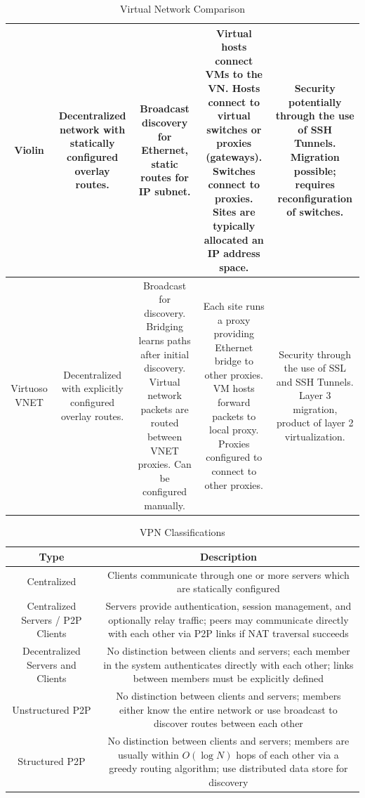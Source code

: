 \begin{table}[ht]
\begin{tabular*}{0.75\textwidth}{|c||c|c|c|c|}
\\ \hline
Violin
&
Decentralized network with statically configured overlay routes.
&
Broadcast discovery for Ethernet, static routes for IP subnet.
&
Virtual hosts connect VMs to the VN.  Hosts connect to virtual switches or
proxies (gateways).  Switches connect to proxies.  Sites are typically
allocated an IP address space.
&
Security potentially through the use of SSH Tunnels.  Migration possible;
requires reconfiguration of switches. 
\\ \hline
Virtuoso VNET
&
Decentralized with explicitly configured overlay routes.
&
Broadcast for discovery.  Bridging learns paths after initial discovery.  Virtual
network packets are routed between VNET proxies.  Can be configured manually.
&
Each site runs a proxy providing Ethernet bridge to other proxies.  VM hosts
forward packets to local proxy.  Proxies configured to connect to other proxies.
&
Security through the use of SSL and SSH Tunnels.  Layer 3 migration, product of
layer 2 virtualization.
\\ \hline
\end{tabular*}
\caption{Virtual Network Comparison}
\label{tab:virtual_networks}
\end{table}

\begin{table}[ht]
\caption{VPN Classifications}
\label{tab:vpn_types}
\begin{center}
\begin{tabular*}{0.75\textwidth}{|c|c|} \hline
Type & Description \\ \hline
Centralized & Clients communicate through one or more servers which are statically
configured \\ \hline
Centralized Servers / P2P Clients & Servers provide authentication, session management, and
optionally relay traffic; peers may communicate directly with each
other via P2P links if NAT traversal succeeds\\ \hline
Decentralized Servers and Clients & No distinction between clients and servers;
each member in the system authenticates directly with each other; links between
members must be explicitly defined \\ \hline
Unstructured P2P & No distinction between clients and servers; members either know
the entire network or use broadcast to discover routes between each other \\ \hline
Structured P2P & No distinction between clients and servers; members are usually
within $O(\log N)$ hops of each other via a greedy routing algorithm; use
distributed data store for discovery \\ \hline
\end{tabular*}
\end{center}
\end{table}

